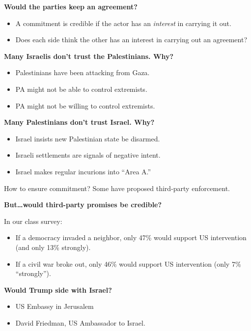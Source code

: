 \documentclass{article}
\begin{document}
{\bf Would the parties keep an agreement?}

\begin{itemize}
  \item A commitment is credible if the actor has an {\it interest} in carrying it out.
  \item Does each side think the other has an interest in carrying out an agreement?
\end{itemize}

{\bf Many Israelis don't trust the Palestinians. Why?}

\begin{itemize}
  \item Palestinians have been attacking from Gaza.
  \item PA might not be able to control extremists.
  \item PA might not be willing to control extremists.
\end{itemize}

{\bf Many Palestinians don't trust Israel.  Why?}

\begin{itemize}
  \item Israel insists new Palestinian state be disarmed.
  \item Israeli settlements are signals of negative intent.
  \item Israel makes regular incurions into ``Area A.''
\end{itemize}

How to ensure commitment?  Some have proposed third-party enforcement.

{\bf But\ldots would third-party promises be credible?}

In our class survey:

\begin{itemize}
  \item If a democracy invaded a neighbor, only 47\% would support US intervention (and only 13\% strongly).
  \item If a civil war broke out, only 46\% would support US intervention (only 7\% ``strongly'').
\end{itemize}

{\bf Would Trump side with Israel?}

\begin{itemize}
  \item US Embassy in Jerusalem
  \item David Friedman, US Ambassador to Israel.
\end{itemize}
\end{document}

